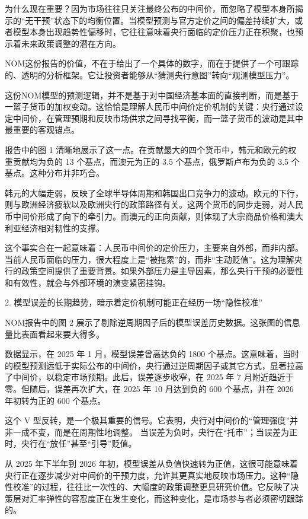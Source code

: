 \documentclass[11pt]{ctexart}
\begin{document}
为什么现在重要？因为市场往往只关注最终公布的中间价，而忽略了模型本身所揭示的“无干预”状态下的均衡位置。当模型预测与官方定价之间的偏差持续扩大，或者模型本身出现趋势性偏移时，它往往意味着央行面临的定价压力正在积聚，也预示着未来政策调整的潜在方向。

NOM这份报告的价值，不在于给出了一个具体的数字，而在于提供了一个可跟踪的、透明的分析框架。它让投资者能够从“猜测央行意图”转向“观测模型压力”。

这份NOM模型的预测逻辑，并不是基于对中国经济基本面的直接判断，而是基于一篮子货币的加权变动。这恰恰是理解人民币中间价定价机制的关键：央行通过设定中间价，在管理预期和反映市场供求之间寻找平衡，而一篮子货币的波动是其中最重要的客观锚点。

报告中的图 1 清晰地展示了这一点。在贡献最大的四个货币中，韩元和欧元的权重贡献均为负的 13 个基点，而澳元为正的 3.5 个基点，俄罗斯卢布为负的 3.5 个基点。这种分布并非巧合。

韩元的大幅走弱，反映了全球半导体周期和韩国出口竞争力的波动。欧元的下行，则与欧洲经济疲软以及欧洲央行的政策路径有关。这两个货币的同步走弱，对人民币中间价形成了向下的牵引力。而澳元的正向贡献，则体现了大宗商品价格和澳大利亚经济相对韧性的支撑。

这个事实合在一起意味着：人民币中间价的定价压力，主要来自外部，而非内部。 当前人民币面临的压力，很大程度上是“被拖累”的，而非“主动贬值”。这为理解央行的政策空间提供了重要背景。如果外部压力是主导因素，那么央行干预的必要性和有效性，就会与外部环境的演变紧密挂钩。

2. 模型误差的长期趋势，暗示着定价机制可能正在经历一场“隐性校准”

NOM报告中的图 2 展示了剔除逆周期因子后的模型误差历史数据。这张图的信息量比表面看起来要大得多。

数据显示，在 2025 年 1 月，模型误差曾高达负的 1800 个基点。这意味着，当时的模型预测远低于实际公布的中间价，央行通过逆周期因子或其它方式，显著拉高了中间价，以稳定市场预期。此后，误差逐步收窄，在 2025 年 7 月附近趋近于零。但随后，误差再次扩大，在 2025 年 10 月达到负的 600 个基点，并在 2026 年初转为正的 600 个基点。

这个 V 型反转，是一个极其重要的信号。它表明，央行对中间价的“管理强度”并非一成不变，而是在周期性地调整。 当误差为负时，央行在“托市”；当误差为正时，央行在“放任”甚至“引导”贬值。

从 2025 年下半年到 2026 年初，模型误差从负值快速转为正值，这很可能意味着央行正在逐步减少对中间价的干预力度，允许其更真实地反映市场压力。这种“隐性校准”的过程，往往比一次性的、大幅度的政策调整更具研究价值。它反映了决策层对汇率弹性的容忍度正在发生变化，而这种变化，是市场参与者必须密切跟踪的。
\end{document}
